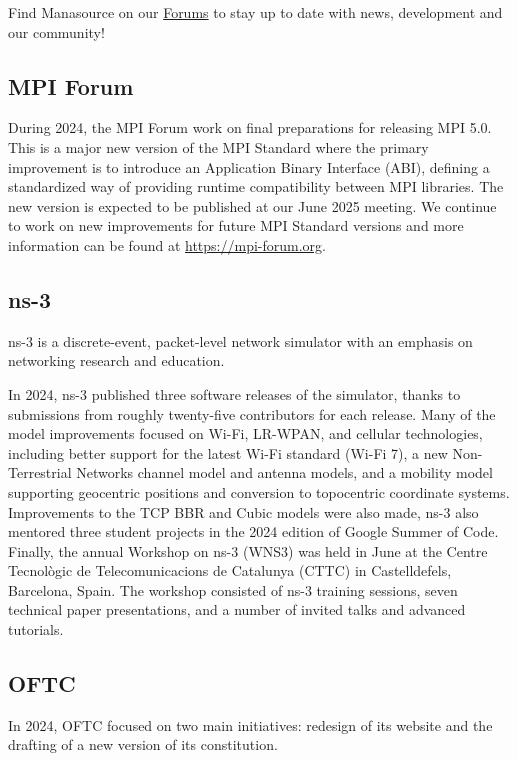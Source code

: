 \documentclass[a4paper]{report}
\begin{document}
Find Manasource on our \href{https://forums.themanaworld.org/}{Forums} to stay up to date with news, development and our community!

\subsection{MPI Forum}

During 2024, the MPI Forum work on final preparations for releasing MPI 5.0. This is a major new version of the MPI Standard where the primary improvement is to introduce an Application Binary Interface (ABI), defining a standardized way of providing runtime compatibility between MPI libraries. The new version is expected to be published at our June 2025 meeting. We continue to work on new improvements for future MPI Standard versions and more information can be found at \href{https://mpi-forum.org}{https://mpi-forum.org}.

\subsection{ns-3}

ns-3 is a discrete-event, packet-level network simulator with an emphasis on networking research and education.

In 2024, ns-3 published three software releases of the simulator, thanks to submissions from roughly twenty-five contributors for each release. Many of the model improvements focused on Wi-Fi, LR-WPAN, and cellular technologies, including better support for the latest Wi-Fi standard (Wi-Fi 7), a new Non-Terrestrial Networks channel model and antenna models, and a mobility model supporting geocentric positions and conversion to topocentric coordinate systems. Improvements to the TCP BBR and Cubic models were also made,  ns-3 also mentored three student projects in the 2024 edition of Google Summer of Code. Finally, the annual Workshop on ns-3 (WNS3) was held in June at the Centre Tecnològic de Telecomunicacions de Catalunya (CTTC) in Castelldefels, Barcelona, Spain.  The workshop consisted of ns-3 training sessions, seven technical paper presentations, and a number of invited talks and advanced tutorials.

\subsection{OFTC}

In 2024, OFTC focused on two main initiatives: redesign of its website and the drafting of a new version of its constitution.
\end{document}
